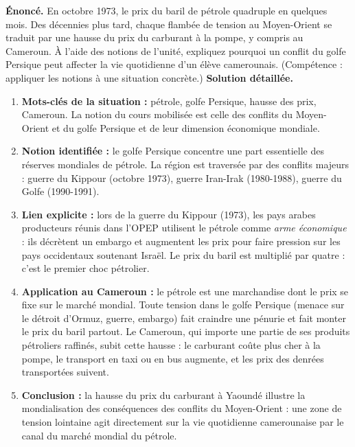 \documentclass[11pt]{article}
\newcommand{\cle}[1]{{\popxbold\color{popdark}#1}}
\begin{document}
\begin{exoresolu}
\textbf{Énoncé.} En octobre 1973, le prix du baril de pétrole quadruple en quelques mois. Des décennies plus tard, chaque flambée de tension au Moyen-Orient se traduit par une hausse du prix du carburant à la pompe, y compris au Cameroun. À l'aide des notions de l'unité, expliquez pourquoi un conflit du golfe Persique peut affecter la vie quotidienne d'un élève camerounais. (Compétence : appliquer les notions à une situation concrète.)
\tcblower
\textbf{Solution détaillée.}
\begin{enumerate}
\item \textbf{Mots-clés de la situation :} pétrole, golfe Persique, hausse des prix, Cameroun. La notion du cours mobilisée est celle des \cle{conflits du Moyen-Orient et du golfe Persique} et de leur dimension économique mondiale.
\item \textbf{Notion identifiée :} le golfe Persique concentre une part essentielle des réserves mondiales de pétrole. La région est traversée par des conflits majeurs : guerre du Kippour (octobre 1973), guerre Iran-Irak (1980-1988), guerre du Golfe (1990-1991).
\item \textbf{Lien explicite :} lors de la guerre du Kippour (1973), les pays arabes producteurs réunis dans l'\cle{OPEP} utilisent le pétrole comme \emph{arme économique} : ils décrètent un embargo et augmentent les prix pour faire pression sur les pays occidentaux soutenant Israël. Le prix du baril est multiplié par quatre : c'est le \cle{premier choc pétrolier}.
\item \textbf{Application au Cameroun :} le pétrole est une marchandise dont le prix se fixe sur le marché mondial. Toute tension dans le golfe Persique (menace sur le détroit d'Ormuz, guerre, embargo) fait craindre une pénurie et fait monter le prix du baril partout. Le Cameroun, qui importe une partie de ses produits pétroliers raffinés, subit cette hausse : le carburant coûte plus cher à la pompe, le transport en taxi ou en bus augmente, et les prix des denrées transportées suivent.
\item \textbf{Conclusion :} la hausse du prix du carburant à Yaoundé illustre la mondialisation des conséquences des conflits du Moyen-Orient : une zone de tension lointaine agit directement sur la vie quotidienne camerounaise par le canal du marché mondial du pétrole.
\end{enumerate}
\end{exoresolu}
\end{document}
